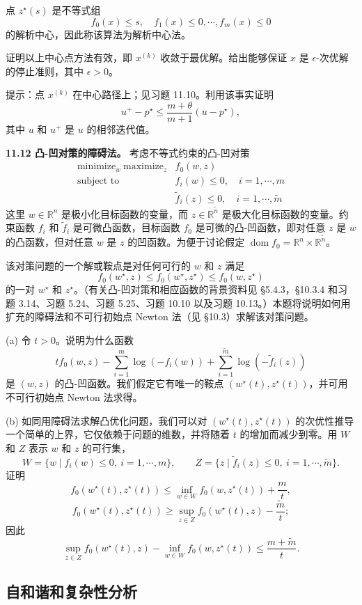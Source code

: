 \documentclass[UTF8, 12pt, fontset=fandol, oneside]{ctexart}
\begin{document}
点 $z^\star(s)$ 是不等式组
\[
f_0(x)\leq s,\quad f_1(x)\leq 0,\cdots,f_m(x)\leq 0
\]
的解析中心，因此称该算法为解析中心法。

证明以上中心点方法有效，即 $x^{(k)}$ 收敛于最优解。给出能够保证 $x$ 是 $\epsilon$-次优解的停止准则，其中 $\epsilon>0$。

提示：点 $x^{(k)}$ 在中心路径上；见习题 11.10。利用该事实证明
\[
u^+-p^\star\leq \frac{m+\theta}{m+1}(u-p^\star),
\]
其中 $u$ 和 $u^+$ 是 $u$ 的相邻迭代值。

\noindent\textbf{11.12 凸-凹对策的障碍法。} 考虑不等式约束的凸-凹对策
\[
\begin{array}{ll}
\text{minimize}_w\ \text{maximize}_z & f_0(w,z)\\
\text{subject to} & f_i(w)\leq 0,\quad i=1,\cdots,m\\
& \tilde f_i(z)\leq 0,\quad i=1,\cdots,\tilde m
\end{array}
\]
这里 $w\in\mathbb{R}^n$ 是极小化目标函数的变量，而 $z\in\mathbb{R}^{\tilde n}$ 是极大化目标函数的变量。约束函数 $f_i$ 和 $\tilde f_i$ 是可微凸函数，目标函数 $f_0$ 是可微的凸-凹函数，即对任意 $z$ 是 $w$ 的凸函数，但对任意 $w$ 是 $z$ 的凹函数。为便于讨论假定 $\operatorname{dom} f_0=\mathbb{R}^n\times\mathbb{R}^{\tilde n}$。

该对策问题的一个解或鞍点是对任何可行的 $w$ 和 $z$ 满足
\[
f_0(w^\star,z)\leq f_0(w^\star,z^\star)\leq f_0(w,z^\star)
\]
的一对 $w^\star$ 和 $z^\star$。（有关凸-凹对策和相应函数的背景资料见 \S5.4.3，\S10.3.4 和习题 3.14、习题 5.24、习题 5.25、习题 10.10 以及习题 10.13。）本题将说明如何用扩充的障碍法和不可行初始点 Newton 法（见 \S10.3）求解该对策问题。

(a) 令 $t>0$。说明为什么函数
\[
tf_0(w,z)-\sum_{i=1}^m\log(-f_i(w))+\sum_{i=1}^{\tilde m}\log(-\tilde f_i(z))
\]
是 $(w,z)$ 的凸-凹函数。我们假定它有唯一的鞍点 $(w^\star(t),z^\star(t))$，并可用不可行初始点 Newton 法求得。

(b) 如同用障碍法求解凸优化问题，我们可以对 $(w^\star(t),z^\star(t))$ 的次优性推导一个简单的上界，它仅依赖于问题的维数，并将随着 $t$ 的增加而减少到零。用 $W$ 和 $Z$ 表示 $w$ 和 $z$ 的可行集，
\[
W=\{w\mid f_i(w)\leq 0,\ i=1,\cdots,m\},\qquad
Z=\{z\mid \tilde f_i(z)\leq 0,\ i=1,\cdots,\tilde m\}.
\]
证明
\[
f_0(w^\star(t),z^\star(t))\leq \inf_{w\in W} f_0(w,z^\star(t))+\frac{m}{t},
\]
\[
f_0(w^\star(t),z^\star(t))\geq \sup_{z\in Z} f_0(w^\star(t),z)-\frac{\tilde m}{t};
\]
因此
\[
\sup_{z\in Z} f_0(w^\star(t),z)-\inf_{w\in W} f_0(w,z^\star(t))\leq \frac{m+\tilde m}{t}.
\]

\subsection*{自和谐和复杂性分析}
\end{document}
